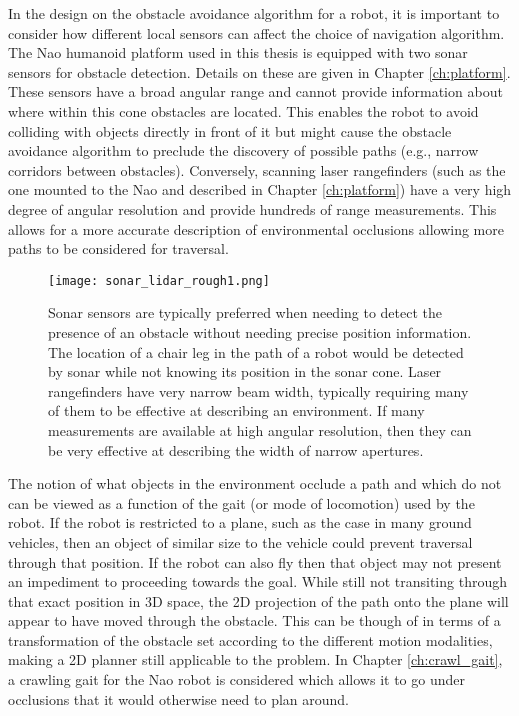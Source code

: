 In the design on the obstacle avoidance algorithm for a robot, it is important to consider how different local sensors 
can affect the choice of navigation algorithm. The Nao humanoid platform
used in this thesis is equipped with two sonar sensors for obstacle detection. Details on these are given in Chapter \ref{ch:platform}.
These sensors have a broad angular range and cannot provide information about where within this cone obstacles are located.
This enables the robot to avoid colliding with objects directly in front of it but might cause the obstacle avoidance algorithm
to preclude the discovery of possible paths (e.g., narrow corridors between obstacles).
Conversely, scanning laser rangefinders (such as the one mounted to the Nao and described in Chapter \ref{ch:platform}) have a
very high degree of angular resolution and provide hundreds of range measurements. This allows for a more accurate description
of environmental occlusions allowing more paths to be considered for traversal.
\begin{figure}
	\centering
	\texttt{[image: sonar\_lidar\_rough1.png]}
	\caption
	{Sonar sensors are typically preferred when needing to detect the presence of an obstacle without
	 needing precise position information. The location of a chair leg in the path of a robot would be
	 detected by sonar while not knowing its position in the sonar cone. Laser rangefinders have very
	 narrow beam width, typically requiring many of them to be effective at describing an environment.
	 If many measurements are available at high angular resolution, then they can be very effective at
	 describing the width of narrow apertures.}
	\label{fig:sonar_vs_lidar1}
\end{figure}

The notion of what objects in the environment occlude a path and which do not can be viewed as a function of the gait 
(or mode of locomotion) used by the robot. If the robot is restricted to a plane, such as the case in many ground vehicles,
then an object of similar size to the vehicle could prevent traversal through that position. If the robot can also fly then
that object may not present an impediment to proceeding towards the goal.
While still not transiting through that exact position in 3D space, the 2D projection of the path onto
the plane will appear to have moved through the obstacle. This can be though of in terms of a transformation of the obstacle set according to the different
motion modalities, making a 2D planner still applicable to the problem. In Chapter \ref{ch:crawl_gait},
a crawling gait for the Nao robot is considered which allows it to go under occlusions that it would otherwise need to plan
around.


